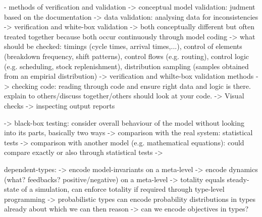 	- methods of verification and validation
	-> conceptual model validation: judment based on the documentation
	-> data validation: analysing data for inconsistencies
	-> verification and white-box validation
		-> both conceptually different but often treated together because both occur continuously through model coding
		-> what should be checked: timings (cycle times, arrival times,...), control of elements (breakdown frequency, shift patterns), control flows (e.g. routing), control logic (e.g. scheduling, stock replenishment), distribution sampling (samples obtained from an empirial distribution)
	-> verification and whilte-box validation methods
		-> checking code: reading through code and ensure right data and logic is there. explain to others/discuss together/others should look at your code. 
		-> Visual checks
		-> inspecting output reports
		
	-> black-box testing: consider overall behaviour of the model without looking into its parts, basically two ways
		-> comparison with the real system: statistical tests
		-> comparison with another model (e.g. mathematical equations): could compare exactly or also through statistical tests
		-> 

dependent-types:
-> encode model-invariants on a meta-level
-> encode dynamics (what? feedbacks? positive/negative) on a meta-level
-> totality equals steady-state of a simulation, can enforce totality if required through type-level programming
-> probabilistic types can encode probability distributions in types already about which we can then reason
-> can we encode objectives in types?